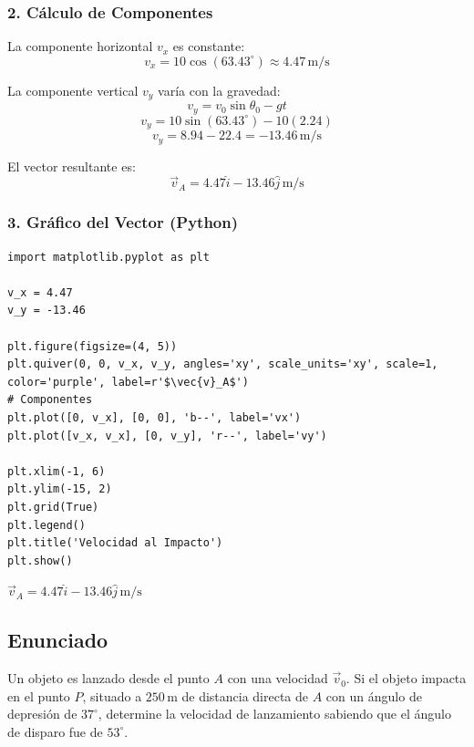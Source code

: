 \documentclass[12pt, a4paper]{article}
\begin{document}
\subsubsection*{2. Cálculo de Componentes}
La componente horizontal $v_x$ es constante:
$$ v_x = 10 \cos(63.43^\circ) \approx 4.47\,\text{m/s} $$

La componente vertical $v_y$ varía con la gravedad:
$$ v_y = v_0 \sin\theta_0 - gt $$
$$ v_y = 10 \sin(63.43^\circ) - 10(2.24) $$
$$ v_y = 8.94 - 22.4 = -13.46\,\text{m/s} $$

El vector resultante es:
$$ \vec{v}_A = 4.47\hat{i} - 13.46\hat{j} \,\text{m/s} $$

\subsubsection*{3. Gráfico del Vector (Python)}
\begin{verbatim}
import matplotlib.pyplot as plt

v_x = 4.47
v_y = -13.46

plt.figure(figsize=(4, 5))
plt.quiver(0, 0, v_x, v_y, angles='xy', scale_units='xy', scale=1, color='purple', label=r'$\vec{v}_A$')
# Componentes
plt.plot([0, v_x], [0, 0], 'b--', label='vx')
plt.plot([v_x, v_x], [0, v_y], 'r--', label='vy')

plt.xlim(-1, 6)
plt.ylim(-15, 2)
plt.grid(True)
plt.legend()
plt.title('Velocidad al Impacto')
plt.show()
\end{verbatim}

\begin{tcolorbox}[colback=green!5!white, colframe=green!50!black, title=Respuesta Final]
\centering
$\vec{v}_A = 4.47\hat{i} - 13.46\hat{j} \,\text{m/s}$
\end{tcolorbox}

\newpage

\subsection*{Enunciado}
Un objeto es lanzado desde el punto $A$ con una velocidad $\vec{v}_0$. Si el objeto impacta en el punto $P$, situado a $250\,\text{m}$ de distancia directa de $A$ con un ángulo de depresión de $37^\circ$, determine la velocidad de lanzamiento sabiendo que el ángulo de disparo fue de $53^\circ$.
\end{document}
